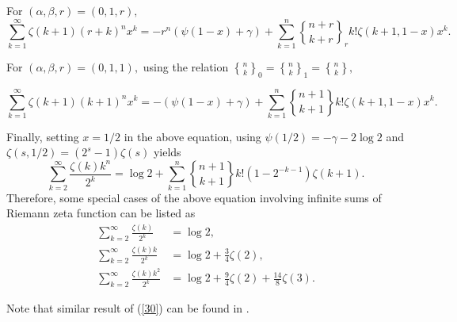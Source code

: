 \documentclass{article}%
\begin{document}
For $\left(  \alpha,\beta,r\right)  =\left(  0,1,r\right)  ,$%
\[
\sum_{k=1}^{\infty}\zeta\left(  k+1\right)  \left(  r+k\right)  ^{n}%
x^{k}=-r^{n}\left(  \psi\left(  1-x\right)  +\gamma\right)  +\sum_{k=1}^{n}%
\genfrac{\{}{\}}{0pt}{}{n+r}{k+r}%
_{r}k!\zeta\left(  k+1,1-x\right)  x^{k}.
\]


For $\left(  \alpha,\beta,r\right)  =\left(  0,1,1\right)  ,$ using the
relation $%
\genfrac{\{}{\}}{0pt}{}{n}{k}%
_{0}=%
\genfrac{\{}{\}}{0pt}{}{n}{k}%
_{1}=%
\genfrac{\{}{\}}{0pt}{}{n}{k}%
,$%

\begin{equation}
\sum_{k=1}^{\infty}\zeta\left(  k+1\right)  \left(  k+1\right)  ^{n}%
x^{k}=-\left(  \psi\left(  1-x\right)  +\gamma\right)  +\sum_{k=1}^{n}%
\genfrac{\{}{\}}{0pt}{}{n+1}{k+1}%
k!\zeta\left(  k+1,1-x\right)  x^{k}. \label{30}%
\end{equation}


Finally, setting $x=1/2$ in the above equation, using $\psi\left(  1/2\right)
=-\gamma-2\log2$ and $\zeta\left(  s,1/2\right)  =\left(  2^{s}-1\right)
\zeta\left(  s\right)  $ yields%
\[
\sum_{k=2}^{\infty}\frac{\zeta\left(  k\right)  k^{n}}{2^{k}}=\log2+\sum
_{k=1}^{n}%
\genfrac{\{}{\}}{0pt}{}{n+1}{k+1}%
k!\left(  1-2^{-k-1}\right)  \zeta\left(  k+1\right)  .
\]
Therefore, some special cases of the above equation involving infinite sums of
Riemann zeta function can be listed as%
\begin{align*}
\sum_{k=2}^{\infty}\frac{\zeta\left(  k\right)  }{2^{k}}  &  =\log2,\\
\sum_{k=2}^{\infty}\frac{\zeta\left(  k\right)  k}{2^{k}}  &  =\log2+\frac
{3}{4}\zeta\left(  2\right)  ,\\
\sum_{k=2}^{\infty}\frac{\zeta\left(  k\right)  k^{2}}{2^{k}}  &  =\log
2+\frac{9}{4}\zeta\left(  2\right)  +\frac{14}{8}\zeta\left(  3\right)  .
\end{align*}


Note that similar result of (\ref{30}) can be found in \cite[Proposition
20]{BandDil}.
\end{document}
